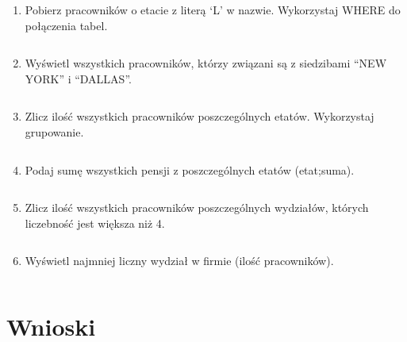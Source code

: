 \documentclass[a4paper, 10pt]{article}
\begin{document}
\begin{enumerate}
\item Pobierz pracowników o etacie z literą `L' w nazwie. Wykorzystaj WHERE do połączenia tabel. 
\begin{lstlisting}[style=SQL]
\end{lstlisting}


\item Wyświetl wszystkich pracowników, którzy związani są z siedzibami ``NEW YORK'' i ``DALLAS''. 
\begin{lstlisting}[style=SQL]
\end{lstlisting}


\item Zlicz ilość wszystkich pracowników poszczególnych etatów. Wykorzystaj grupowanie. 
\begin{lstlisting}[style=SQL]
\end{lstlisting}


\item Podaj sumę wszystkich pensji z poszczególnych etatów (etat;suma).
\begin{lstlisting}[style=SQL]
\end{lstlisting}


\item Zlicz ilość wszystkich pracowników poszczególnych wydziałów, których liczebność jest większa niż 4.  
\begin{lstlisting}[style=SQL]
\end{lstlisting}


\item Wyświetl najmniej liczny wydział w firmie (ilość pracowników).
\begin{lstlisting}[style=SQL]
\end{lstlisting}
\end{enumerate}


\section{Wnioski}
\end{document}
